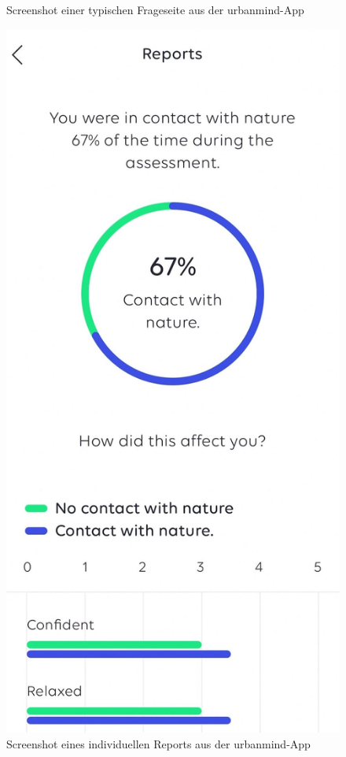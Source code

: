 \begin{figure}[h]
\begin{minipage}[t]{0.38\textwidth}
        \caption{Screenshot einer typischen Frageseite aus der \gls{urbanmind}-App}
        \label{fig:urban_mind_screenshot_1}
    \end{minipage}
    \hspace{0.1\textwidth}
    \begin{minipage}[t]{0.38\textwidth}
        \centering
        \includegraphics[width=\textwidth]{Arbeit/images/urban_mind_report.jpg}
        \caption{Screenshot eines individuellen Reports aus der \gls{urbanmind}-App}
        \label{fig:urban_mind_report}
    \end{minipage}
\end{figure}

